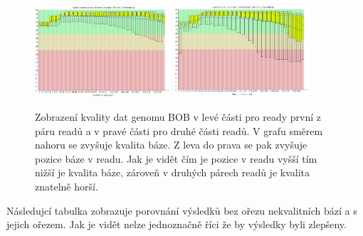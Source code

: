 \documentclass[czech,DP]{thesiskiv}
\numberwithin{equation}{section}
\begin{document}
\begin{figure}[H]		
		\centering
		\includegraphics[width=190px]{./img/quality_graf_bob_trim_r1_8_15.png}
		\includegraphics[width=190px]{./img/quality_graf_bob_trim_r2_8_15.png}
		\caption{Zobrazení kvality dat genomu BOB v levé části pro ready první z páru readů a v pravé části pro druhé části readů. V grafu směrem nahoru se zvyšuje kvalita báze. Z leva do prava se pak zvyšuje pozice báze v readu. Jak je vidět čím je pozice v readu vyšší tím nižší je kvalita báze, zároveň v druhých párech readů je kvalita znatelně horší.}
		\label{fig:graf_quality_no_trim}
\end{figure}


\noindent
Následujcí tabulka zobrazuje porovnání výsledků bez ořezu nekvalitních bází a s jejich ořezem. Jak je vidět nelze jednoznačně říci že by výsledky byli zlepšeny.
\end{document}
